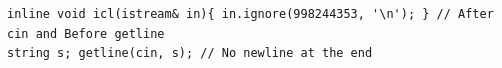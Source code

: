 \begin{verbatim}
inline void icl(istream& in){ in.ignore(998244353, '\n'); } // After cin and Before getline
string s; getline(cin, s); // No newline at the end
\end{verbatim}